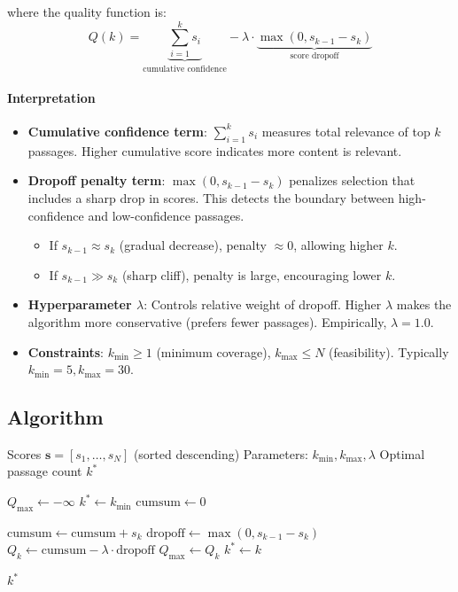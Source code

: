 where the quality function is:
\begin{equation}
Q(k) = \underbrace{\sum_{i=1}^{k} s_i}_{\text{cumulative confidence}} - \lambda \cdot \underbrace{\max(0, s_{k-1} - s_k)}_{\text{score dropoff}}
\end{equation}

\paragraph{Interpretation}
\begin{itemize}
\item \textbf{Cumulative confidence term}: $\sum_{i=1}^{k} s_i$ measures total relevance of top $k$ passages. Higher cumulative score indicates more content is relevant.

\item \textbf{Dropoff penalty term}: $\max(0, s_{k-1} - s_k)$ penalizes selection that includes a sharp drop in scores. This detects the boundary between high-confidence and low-confidence passages.
  \begin{itemize}
  \item If $s_{k-1} \approx s_k$ (gradual decrease), penalty $\approx 0$, allowing higher $k$.
  \item If $s_{k-1} \gg s_k$ (sharp cliff), penalty is large, encouraging lower $k$.
  \end{itemize}

\item \textbf{Hyperparameter $\lambda$}: Controls relative weight of dropoff. Higher $\lambda$ makes the algorithm more conservative (prefers fewer passages). Empirically, $\lambda = 1.0$.

\item \textbf{Constraints}: $k_{\min} \geq 1$ (minimum coverage), $k_{\max} \leq N$ (feasibility). Typically $k_{\min} = 5, k_{\max} = 30$.
\end{itemize}

\subsection*{Algorithm}

\begin{algorithm}
\caption{Adaptive k Selection}
\label{algo:adaptive_k}
\begin{algorithmic}
\Require Scores $\mathbf{s} = [s_1, \ldots, s_N]$ (sorted descending)
\Require Parameters: $k_{\min}, k_{\max}, \lambda$
\Ensure Optimal passage count $k^*$

\State $Q_{\max} \gets -\infty$
\State $k^* \gets k_{\min}$
\State $\text{cumsum} \gets 0$

    \State $\text{cumsum} \gets \text{cumsum} + s_k$ 
    \State $\text{dropoff} \gets \max(0, s_{k-1} - s_k)$ 
    \State $Q_k \gets \text{cumsum} - \lambda \cdot \text{dropoff}$
        \State $Q_{\max} \gets Q_k$
        \State $k^* \gets k$
    \EndIf
\EndFor

\State \Return $k^*$
\end{algorithmic}
\end{algorithm}


